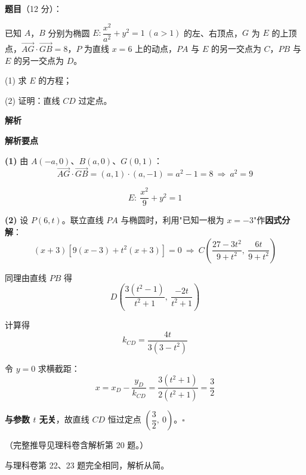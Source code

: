 \begin{answer}

\textbf{题目}（12 分）：

已知 $A$，$B$ 分别为椭圆 $E:\dfrac{x^{2}}{a^{2}}+y^{2}=1\ (a>1)$ 的左、右顶点，$G$ 为 $E$ 的上顶点，$\overrightarrow{AG}\cdot\overrightarrow{GB}=8$，$P$ 为直线 $x=6$ 上的动点，$PA$ 与 $E$ 的另一交点为 $C$，$PB$ 与 $E$ 的另一交点为 $D$。

  (1) 求 $E$ 的方程；

  (2) 证明：直线 $CD$ 过定点。

\textbf{解析}

\textbf{解析要点}

\textbf{(1)} 由 $A(-a,0)$、$B(a,0)$、$G(0,1)$：
\nopagebreak[4]
\[\overrightarrow{AG}\cdot\overrightarrow{GB}=(a,1)\cdot(a,-1)=a^{2}-1=8\ \Longrightarrow\ a^{2}=9\]

\nopagebreak[4]
\[E:\ \frac{x^{2}}9+y^{2}=1\]

\textbf{(2)} 设 $P(6,t)$。联立直线 $PA$ 与椭圆时，利用"已知一根为 $x=-3$"作\textbf{因式分解}：
\nopagebreak[4]
\[(x+3)\left[9(x-3)+t^{2}(x+3)\right]=0\ \Longrightarrow\ C\left(\frac{27-3t^{2}}{9+t^{2}},\ \frac{6t}{9+t^{2}}\right)\]

同理由直线 $PB$ 得
\nopagebreak[4]
\[D\left(\frac{3\left(t^{2}-1\right)}{t^{2}+1},\ \frac{-2t}{t^{2}+1}\right)\]

计算得
\nopagebreak[4]
\[k_{CD}=\frac{4t}{3\left(3-t^{2}\right)}\]

令 $y=0$ 求横截距：
\nopagebreak[4]
\[x=x_D-\frac{y_D}{k_{CD}}=\frac{3\left(t^{2}+1\right)}{2\left(t^{2}+1\right)}=\frac32\]

\textbf{与参数 $t$ 无关}，故直线 $CD$ 恒过定点 $\left(\dfrac32,\ 0\right)$。$\square$

（完整推导见理科卷含解析第 20 题。）



\par\medskip

\end{answer}

\begin{gktip}
与理科卷第 22、23 题完全相同，解析从简。
\end{gktip}

